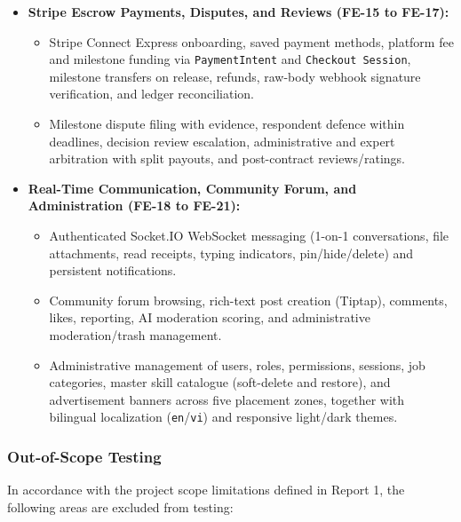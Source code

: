 \documentclass[12pt,a4paper]{article}
\begin{document}
\begin{itemize}
\begin{itemize}
    \item Proposal drafting, submission, editing, withdrawal, and expiry; client proposal evaluation and hiring decision; dual-signature contract execution; platform fee tracking; and milestone creation, funding state transitions, work submission, change requests, and approval.
  \end{itemize}
  \item \textbf{Stripe Escrow Payments, Disputes, and Reviews (FE-15 to FE-17):}
  \begin{itemize}
    \item Stripe Connect Express onboarding, saved payment methods, platform fee and milestone funding via \texttt{PaymentIntent} and \texttt{Checkout Session}, milestone transfers on release, refunds, raw-body webhook signature verification, and ledger reconciliation.
    \item Milestone dispute filing with evidence, respondent defence within deadlines, decision review escalation, administrative and expert arbitration with split payouts, and post-contract reviews/ratings.
  \end{itemize}
  \item \textbf{Real-Time Communication, Community Forum, and Administration (FE-18 to FE-21):}
  \begin{itemize}
    \item Authenticated Socket.IO WebSocket messaging (1-on-1 conversations, file attachments, read receipts, typing indicators, pin/hide/delete) and persistent notifications.
    \item Community forum browsing, rich-text post creation (Tiptap), comments, likes, reporting, AI moderation scoring, and administrative moderation/trash management.
    \item Administrative management of users, roles, permissions, sessions, job categories, master skill catalogue (soft-delete and restore), and advertisement banners across five placement zones, together with bilingual localization (\texttt{en}/\texttt{vi}) and responsive light/dark themes.
  \end{itemize}
\end{itemize}

\subsubsection{Out-of-Scope Testing}

In accordance with the project scope limitations defined in Report 1, the following areas are excluded from testing:
\end{document}
